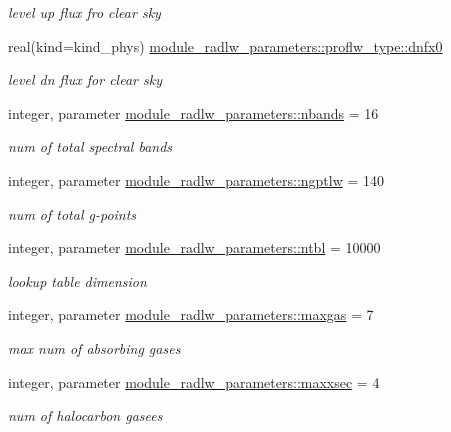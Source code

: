 \begin{DoxyCompactItemize}
\begin{DoxyCompactList}\small\item\em level up flux fro clear sky \end{DoxyCompactList}\item 
real(kind=kind\+\_\+phys) \hyperlink{group__module__radlw__main_ga4804a215b761165846e87428b3f3c12c}{module\+\_\+radlw\+\_\+parameters\+::proflw\+\_\+type\+::dnfx0}
\begin{DoxyCompactList}\small\item\em level dn flux for clear sky \end{DoxyCompactList}\item 
integer, parameter \hyperlink{group__module__radlw__main_ga48e11b992a80595d71c92f7c9bfbe19c}{module\+\_\+radlw\+\_\+parameters\+::nbands} = 16
\begin{DoxyCompactList}\small\item\em num of total spectral bands \end{DoxyCompactList}\item 
integer, parameter \hyperlink{group__module__radlw__main_ga05fe17fe932ce62a3ae2c6c564584321}{module\+\_\+radlw\+\_\+parameters\+::ngptlw} = 140
\begin{DoxyCompactList}\small\item\em num of total g-\/points \end{DoxyCompactList}\item 
integer, parameter \hyperlink{group__module__radlw__main_ga61ae33b9db5bac9962f72e2a0db3c0e4}{module\+\_\+radlw\+\_\+parameters\+::ntbl} = 10000
\begin{DoxyCompactList}\small\item\em lookup table dimension \end{DoxyCompactList}\item 
integer, parameter \hyperlink{group__module__radlw__main_ga01330b4ad09907f2db51cb516ed21033}{module\+\_\+radlw\+\_\+parameters\+::maxgas} = 7
\begin{DoxyCompactList}\small\item\em max num of absorbing gases \end{DoxyCompactList}\item 
integer, parameter \hyperlink{group__module__radlw__main_ga5817221936731c6ee6443da6a64e934e}{module\+\_\+radlw\+\_\+parameters\+::maxxsec} = 4
\begin{DoxyCompactList}\small\item\em num of halocarbon gasees \end{DoxyCompactList}\item 

\end{DoxyCompactItemize}
